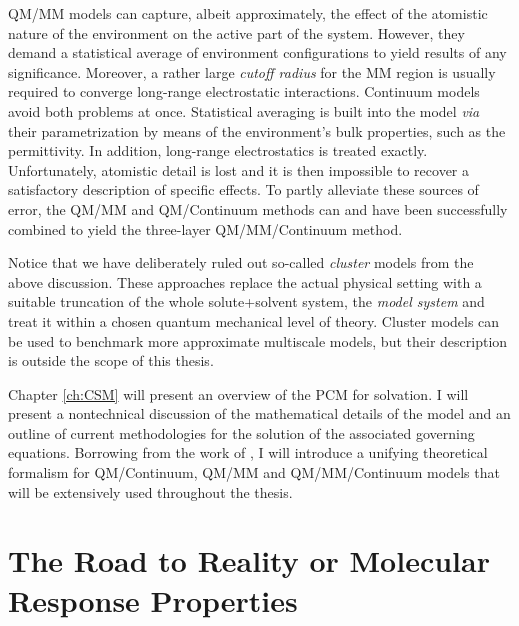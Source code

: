 \acrshort{QM}/\acrshort{MM} models can capture, albeit approximately, the effect
of the atomistic nature of the environment on the active part of the
system.
However, they demand a statistical average of environment configurations
to yield results of any significance. Moreover, a rather large
\emph{cutoff radius} for the \acrshort{MM} region is usually required to converge
long-range electrostatic interactions.\autocite{Steindal2011-ki}
Continuum models avoid both problems at once. Statistical averaging is
built into the model \emph{via} their parametrization by
means of the environment's bulk properties, such as the permittivity.
In addition, long-range electrostatics is treated exactly.
Unfortunately, atomistic detail is lost and it is then impossible to
recover a satisfactory description of specific effects.
To partly alleviate these sources of error, the
\acrshort{QM}/\acrshort{MM} and \acrshort{QM}/Continuum methods can and
have been successfully combined to yield the three-layer
\acrshort{QM}/\acrshort{MM}/Continuum method.\autocite{Steindal2011-ki,
Lipparini2011-rd, Caprasecca2012-ir, Lipparini2013-ud}

Notice that we have deliberately ruled out so-called \emph{cluster}
models from the above discussion.
These approaches replace the actual physical setting with a suitable
truncation of the whole solute+solvent system, the \emph{model system}
and treat it within a chosen quantum mechanical level of theory.
Cluster models can be used to benchmark more approximate multiscale
models, but their description is outside the scope of this thesis.

Chapter \ref{ch:CSM} will present an overview of the \gls{PCM} for
solvation.
I will present a nontechnical discussion of the mathematical details of
the model and an outline of current methodologies for the solution of
the associated governing equations.
Borrowing from the work of \citeauthor{Lipparini2010-be},\autocite{Lipparini2010-be,
Lipparini2015-lq} I will introduce a unifying theoretical formalism for
\acrshort{QM}/Continuum, \acrshort{QM}/\acrshort{MM} and \acrshort{QM}/\acrshort{MM}/Continuum models that will
be extensively used throughout the thesis.

\section*{The Road to Reality or Molecular Response Properties}


